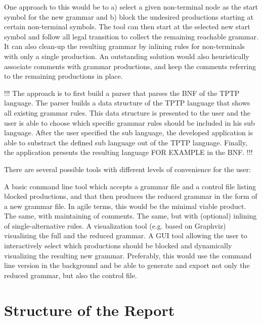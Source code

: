 One approach to this would be to a) select a given non-terminal node as the start symbol for the new grammar and b) block the undesired productions starting at certain non-terminal symbols. The tool can then start at the selected new start symbol and follow all legal transition to collect the remaining reachable grammar. It can also clean-up the resulting grammar by inlining rules for non-terminals with only a single production. An outstanding solution would also heuristically associate comments with grammar productions, and keep the comments referring to the remaining productions in place.

!!!
The approach is to first build a parser that parses the \ac{BNF} of the \ac{TPTP} language. The parser builds a data structure of the \ac{TPTP} language that shows all existing grammar rules. This data structure is presented to the user and the user is able to choose which specific grammar rules should be included in his sub language. After the user specified the sub language, the developed application is able to substract the defined sub language out of the \ac{TPTP} language. Finally, the application presents the resulting language FOR EXAMPLE in the \ac{BNF}. 
!!!

There are several possible tools with different levels of convenience for the user:

A basic command line tool which accepts a grammar file and a control file listing blocked productions, and that then produces the reduced grammar in the form of a new grammar file. In agile terms, this would be the minimal viable product.
The same, with maintaining of comments.
The same, but with (optional) inlining of single-alternative rules.
A visualization tool (e.g. based on Graphviz) visualizing the full and the reduced grammar.
A GUI tool allowing the user to interactively select which productions should be blocked and dynamically visualizing the resulting new grammar. Preferably, this would use the command line version in the background and be able to generate and export not only the reduced grammar, but also the control file.
\section{Structure of the Report}\label{sec:Structure}
